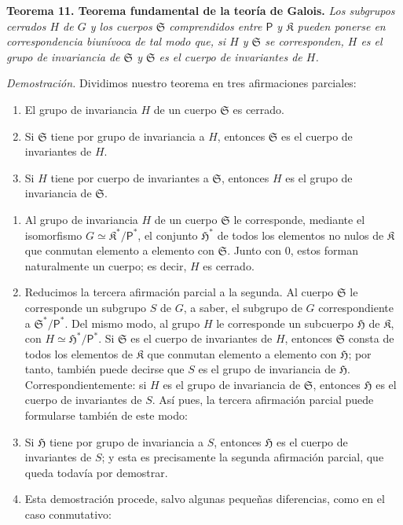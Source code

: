 \textbf{Teorema 11. Teorema fundamental de la teoría de Galois.} \emph{Los subgrupos cerrados \(H\) de \(G\) y los cuerpos \(\mathfrak S\) comprendidos entre \(\mathsf P\) y \(\mathfrak K\) pueden ponerse en correspondencia biunívoca de tal modo que, si \(H\) y \(\mathfrak S\) se corresponden, \(H\) es el grupo de invariancia de \(\mathfrak S\) y \(\mathfrak S\) es el cuerpo de invariantes de \(H\).}

\emph{Demostración.} Dividimos nuestro teorema en tres afirmaciones parciales:
\begin{enumerate}
\item El grupo de invariancia \(H\) de un cuerpo \(\mathfrak S\) es cerrado.
\item Si \(\mathfrak S\) tiene por grupo de invariancia a \(H\), entonces \(\mathfrak S\) es el cuerpo de invariantes de \(H\).
\item Si \(H\) tiene por cuerpo de invariantes a \(\mathfrak S\), entonces \(H\) es el grupo de invariancia de \(\mathfrak S\).
\end{enumerate}

\begin{enumerate}
\item Al grupo de invariancia \(H\) de un cuerpo \(\mathfrak S\) le corresponde, mediante el isomorfismo \(G\simeq\mathfrak K^*/\mathsf P^*\), el conjunto \(\mathfrak H^*\) de todos los elementos no nulos de \(\mathfrak K\) que conmutan elemento a elemento con \(\mathfrak S\). Junto con 0, estos forman naturalmente un cuerpo; es decir, \(H\) es cerrado.

\item Reducimos la tercera afirmación parcial a la segunda. Al cuerpo \(\mathfrak S\) le corresponde un subgrupo \(S\) de \(G\), a saber, el subgrupo de \(G\) correspondiente a \(\mathfrak S^*/\mathsf P^*\). Del mismo modo, al grupo \(H\) le corresponde un subcuerpo \(\mathfrak H\) de \(\mathfrak K\), con \(H\simeq\mathfrak H^*/\mathsf P^*\). Si \(\mathfrak S\) es el cuerpo de invariantes de \(H\), entonces \(\mathfrak S\) consta de todos los elementos de \(\mathfrak K\) que conmutan elemento a elemento con \(\mathfrak H\); por tanto, también puede decirse que \(S\) es el grupo de invariancia de \(\mathfrak H\). Correspondientemente: si \(H\) es el grupo de invariancia de \(\mathfrak S\), entonces \(\mathfrak H\) es el cuerpo de invariantes de \(S\). Así pues, la tercera afirmación parcial puede formularse también de este modo:

\item[\(3'\).] Si \(\mathfrak H\) tiene por grupo de invariancia a \(S\), entonces \(\mathfrak H\) es el cuerpo de invariantes de \(S\); y esta es precisamente la segunda afirmación parcial, que queda todavía por demostrar.

\item[3.] Esta demostración procede, salvo algunas pequeñas diferencias, como en el caso conmutativo:
\end{enumerate}


